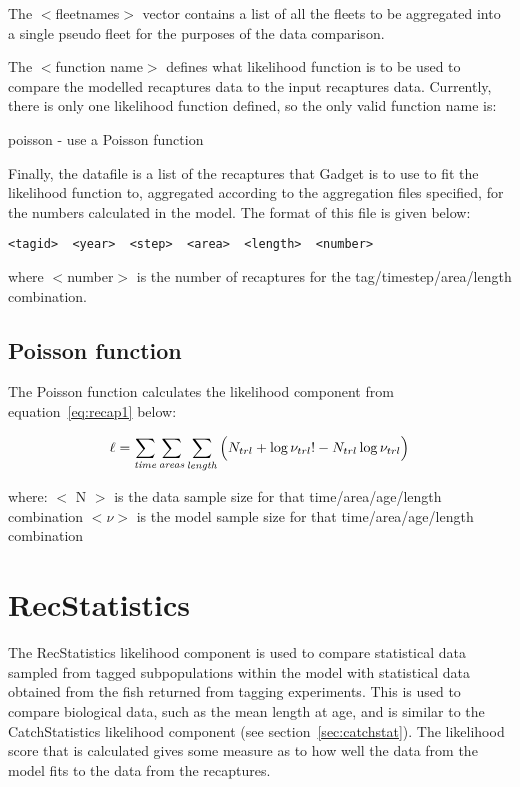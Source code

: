 \documentclass [a4paper, 10pt]{book}
\begin{document}
The $<$fleetnames$>$ vector contains a list of all the fleets to be aggregated into a single pseudo fleet for the purposes of the data comparison.

\bigskip
The $<$function name$>$ defines what likelihood function is to be used to compare the modelled recaptures data to the input recaptures data.  Currently, there is only one likelihood function defined, so the only valid function name is:

\bigskip
poisson - use a Poisson function

\bigskip
Finally, the datafile is a list of the recaptures that Gadget is to use to fit the likelihood function to, aggregated according to the aggregation files specified, for the numbers calculated in the model. The format of this file is given below:

{\small\begin{verbatim}
<tagid>  <year>  <step>  <area>  <length>  <number>
\end{verbatim}}

where $<$number$>$ is the number of recaptures for the tag/timestep/area/length combination.

\subsection{Poisson function}
The Poisson function calculates the likelihood component from equation~\ref{eq:recap1} below:

\begin{equation}\label{eq:recap1}
\ell = \sum_{\it time}\sum_{\it areas}\sum_{\it length} \Big( N_{trl} + \log \nu_{trl}! - N_{trl} \log \nu_{trl} \Big)
\end{equation}

where:\newline
$<$ N $>$ is the data sample size for that time/area/age/length combination\newline
$<\nu>$ is the model sample size for that time/area/age/length combination

\section{RecStatistics}\label{sec:recstat}
The RecStatistics likelihood component is used to compare statistical data sampled from tagged subpopulations within the model with statistical data obtained from the fish returned from tagging experiments.  This is used to compare biological data, such as the mean length at age, and is similar to the CatchStatistics likelihood component (see section~\ref{sec:catchstat}).  The likelihood score that is calculated gives some measure as to how well the data from the model fits to the data from the recaptures.
\end{document}
